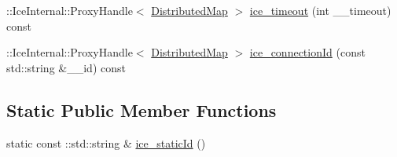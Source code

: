 \begin{DoxyCompactItemize}
\item 
::IceInternal::ProxyHandle$<$ \hyperlink{class_ice_proxy_1_1_global_table_1_1_distributed_map}{DistributedMap} $>$ \hyperlink{class_ice_proxy_1_1_global_table_1_1_distributed_map_ac2a72cb5d896a00ad19316493ed5a2fc}{ice\_\-timeout} (int \_\-\_\-timeout) const 
\item 
::IceInternal::ProxyHandle$<$ \hyperlink{class_ice_proxy_1_1_global_table_1_1_distributed_map}{DistributedMap} $>$ \hyperlink{class_ice_proxy_1_1_global_table_1_1_distributed_map_a5a368d40812f656a7c93e305707ac40f}{ice\_\-connectionId} (const std::string \&\_\-\_\-id) const 
\end{DoxyCompactItemize}
\subsection*{Static Public Member Functions}
\begin{DoxyCompactItemize}
\item 
static const ::std::string \& \hyperlink{class_ice_proxy_1_1_global_table_1_1_distributed_map_a1dc837dbc066fbd83a83b2c86fa6b14c}{ice\_\-staticId} ()
\end{DoxyCompactItemize}


